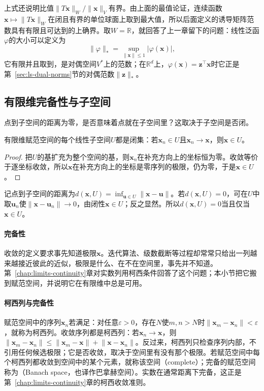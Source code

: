 上式还说明比值$\lVert T\bm x\rVert_W/\lVert\bm x\rVert_V$有界。由上面的最值论证，连续函数$\bm x\mapsto\lVert T\bm x\rVert_W$在闭且有界的单位球面上取到最大值，所以后面定义的诱导矩阵范数具有有限且可达到的上确界。取$W=\mathbb R$，就回答了上一章留下的问题：线性泛函$\varphi$的大小可以定义为
\[
 \lVert\varphi\rVert_*=\sup_{\lVert\bm x\rVert\leq1}|\varphi(\bm x)|,
\]
它有限并且取到，是对偶空间$V^*$上的范数；在$\mathbb R^d$上，$\varphi(\bm x)=\bm z^\top\bm x$时它正是第~\ref{sec:ls-dual-norms}节的对偶范数$\lVert\bm z\rVert_*$。

\subsection{有限维完备性与子空间}

点到子空间的距离为零，是否意味着点就在子空间里？这取决于子空间是否闭。
\begin{theorem}[有限维子空间闭性]
\label{thm:ls-subspace-closed}
有限维赋范空间的每个线性子空间$U$都是闭集：若$\bm x_n\in U$且$\bm x_n\to\bm x$，则$\bm x\in U$。
\end{theorem}
\begin{proof}
把$U$的基扩充为整个空间的基，则$\bm x_n$在补充方向上的坐标恒为零。收敛等价于逐坐标收敛，所以$\bm x$在补充方向上的坐标是零序列的极限，仍为零，于是$\bm x\in U$。
\end{proof}
记点到子空间的距离为$d(\bm x,U)=\inf_{\bm u\in U}\lVert\bm x-\bm u\rVert$。若$d(\bm x,U)=0$，可在$U$中取$\bm u_n$使$\lVert\bm x-\bm u_n\rVert\to0$，由闭性$\bm x\in U$；反之显然。所以$d(\bm x,U)=0$当且仅当$\bm x\in U$。

\paragraph{完备性}
\label{sec:ls-banach-spaces}

收敛的定义要求事先知道极限$\bm x$。迭代算法、级数截断等过程却常常只给出一列越来越接近彼此的近似，极限是什么、在不在空间里，事先并不知道。第~\ref{chap:limits-continuity}章对实数列用柯西条件回答了这个问题；本小节把它搬到赋范空间，并说明它在有限维中总是可用。

\paragraph{柯西列与完备性}
赋范空间中的序列$\bm x_n$若满足：对任意$\varepsilon>0$，存在$N$使$m,n>N$时$\lVert\bm x_m-\bm x_n\rVert<\varepsilon$，就称为柯西列。收敛序列都是柯西列：若$\bm x_n\to\bm x$，则$\lVert\bm x_m-\bm x_n\rVert\leq\lVert\bm x_m-\bm x\rVert+\lVert\bm x-\bm x_n\rVert$。反过来，柯西列只检查序列内部，不引用任何候选极限；它是否收敛，取决于空间里有没有那个极限。若赋范空间中每个柯西列都收敛到空间中的某个元素，就称该空间（complete）；完备的赋范空间称为（Banach space，也译作巴拿赫空间）。实数在通常距离下完备，这正是第~\ref{chap:limits-continuity}章的柯西收敛准则。

